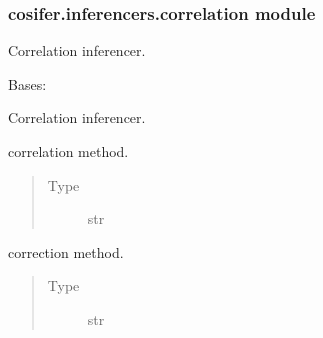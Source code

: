 \documentclass[letterpaper,10pt,english]{sphinxmanual}
\begin{document}
\subsubsection{cosifer.inferencers.correlation module}
\label{\detokenize{_modules/cosifer.inferencers:module-cosifer.inferencers.correlation}}\label{\detokenize{_modules/cosifer.inferencers:cosifer-inferencers-correlation-module}}
Correlation inferencer.

\begin{fulllineitems}
\label{\detokenize{_modules/cosifer.inferencers:cosifer.inferencers.correlation.Correlation}}
Bases: {\hyperref[\detokenize{_modules/cosifer.inferencers:cosifer.inferencers.network_inferencer.NetworkInferencer}]{}}

Correlation inferencer.

\begin{fulllineitems}
\label{\detokenize{_modules/cosifer.inferencers:cosifer.inferencers.correlation.Correlation.method}}
correlation method.
\begin{quote}\begin{description}
\item[{Type}] \leavevmode
str

\end{description}\end{quote}

\end{fulllineitems}


\begin{fulllineitems}
\label{\detokenize{_modules/cosifer.inferencers:cosifer.inferencers.correlation.Correlation.correction}}
correction method.
\begin{quote}\begin{description}
\item[{Type}] \leavevmode
str


\end{description}
\end{quote}
\end{fulllineitems}
\end{fulllineitems}
\end{document}
